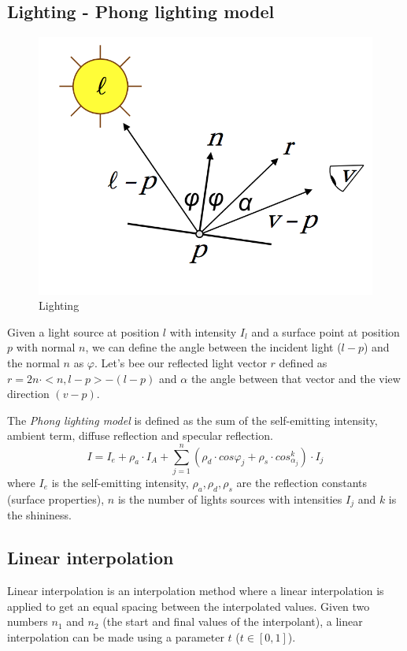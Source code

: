 
\subsection{Lighting - Phong lighting model}

\begin{figure}[h!]
  \centering
  \includegraphics[scale=0.6]{images/lighting}
\caption{Lighting}
\end{figure}
Given a light source at position $l$ with intensity $I_l$ and a surface point at position $p$ with normal $n$,
we can define the angle between the incident light ($l-p$) and the normal $n$ as $\varphi$.
Let's bee our reflected light vector $r$ defined as $r = 2 n \cdot <n, l - p> - (l-p)$ and $\alpha$ the angle between that vector and the view direction $(v - p)$.

The \textit{Phong lighting model} is defined as the sum of the self-emitting intensity, ambient term, diffuse reflection and specular reflection.
$$ I = I_e + {\rho}_a \cdot I_A + \sum_{j=1}^n ({\rho}_d \cdot cos {\varphi}_j + {\rho}_s \cdot cos_{\alpha_j}^k) \cdot I_j$$ where $I_e$ is the self-emitting intensity, ${\rho}_a, {\rho}_d, {\rho}_s$ are the reflection constants (surface properties), $n$ is the number of lights sources with intensities $I_j$ and $k$ is the shininess.
\cite{SLIDE:ICORSI}


\subsection{Linear interpolation}
Linear interpolation is an interpolation method where a linear interpolation is applied to get an equal spacing between the interpolated values. Given two numbers $n_1$ and $n_2$ (the start and final values of the interpolant), a linear interpolation can be made using a parameter $t$ ($t \in [0,1]$). \cite{WEBSITE:interpolation}


